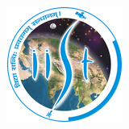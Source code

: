 \documentclass[12pt]{article}
\begin{document}
\begin{figure}
\begin{subfigure}{0.15\textwidth}
		\includegraphics[width=\linewidth]{iist_logo}
	\end{subfigure}
\end{figure}

\vspace*{-1cm}
\end{document}
